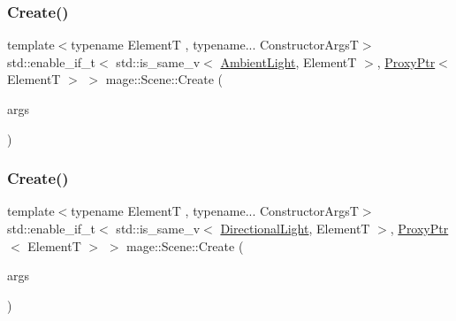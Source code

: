 \hypertarget{classmage_1_1_scene_aaa36f5e8f0aa59adff6ee0f4e534b9ad}{}\label{classmage_1_1_scene_aaa36f5e8f0aa59adff6ee0f4e534b9ad} 
\subsubsection{\texorpdfstring{Create()}{Create()}\hspace{0.1cm}{\footnotesize\ttfamily [4/11]}}
{\footnotesize\ttfamily template$<$typename ElementT , typename... Constructor\+ArgsT$>$ \\
std\+::enable\+\_\+if\+\_\+t$<$ std\+::is\+\_\+same\+\_\+v$<$ \hyperlink{classmage_1_1_ambient_light}{Ambient\+Light}, ElementT $>$, \hyperlink{classmage_1_1_proxy_ptr}{Proxy\+Ptr}$<$ ElementT $>$ $>$ mage\+::\+Scene\+::\+Create (\begin{DoxyParamCaption}\item[{Constructor\+ArgsT \&\&...}]{args }\end{DoxyParamCaption})}

\hypertarget{classmage_1_1_scene_a510c931b82dc5a5a1367d2b3f34b0bb0}{}\label{classmage_1_1_scene_a510c931b82dc5a5a1367d2b3f34b0bb0} 
\subsubsection{\texorpdfstring{Create()}{Create()}\hspace{0.1cm}{\footnotesize\ttfamily [5/11]}}
{\footnotesize\ttfamily template$<$typename ElementT , typename... Constructor\+ArgsT$>$ \\
std\+::enable\+\_\+if\+\_\+t$<$ std\+::is\+\_\+same\+\_\+v$<$ \hyperlink{classmage_1_1_directional_light}{Directional\+Light}, ElementT $>$, \hyperlink{classmage_1_1_proxy_ptr}{Proxy\+Ptr}$<$ ElementT $>$ $>$ mage\+::\+Scene\+::\+Create (\begin{DoxyParamCaption}\item[{Constructor\+ArgsT \&\&...}]{args }\end{DoxyParamCaption})}

\hypertarget{classmage_1_1_scene_a07694db8844dc96c47f838bd48d4f56b}{}\label{classmage_1_1_scene_a07694db8844dc96c47f838bd48d4f56b} 
